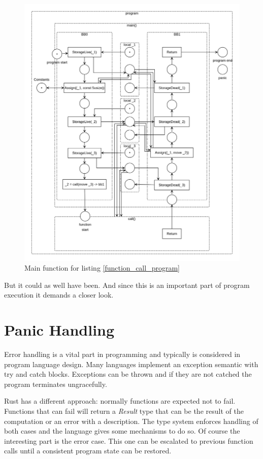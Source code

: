 \begin{figure}
    \centering
    \includegraphics[width=.95\textwidth]{../diagrams/FunctionCallNetPruned.png}
    \caption{Main function for listing \ref{function_call_program}}
    \label{function_call_net_pruned}
\end{figure}


But it could as well have been.
And since this is an important part of program execution it demands a closer look.

\section{Panic Handling}
Error handling is a vital part in programming and typically is considered in program language design.
Many languages implement an exception semantic with try and catch blocks.
Exceptions can be thrown and if they are not catched the program terminates ungracefully.

Rust has a different approach: normally functions are expected not to fail.
Functions that can fail will return a \textit{Result} type that can be the result of the computation or an error with a description.
The type system enforces handling of both cases and the language gives some mechanisms to do so.
Of course the interesting part is the error case.
This one can be escalated to previous function calls until a consistent program state can be restored.

